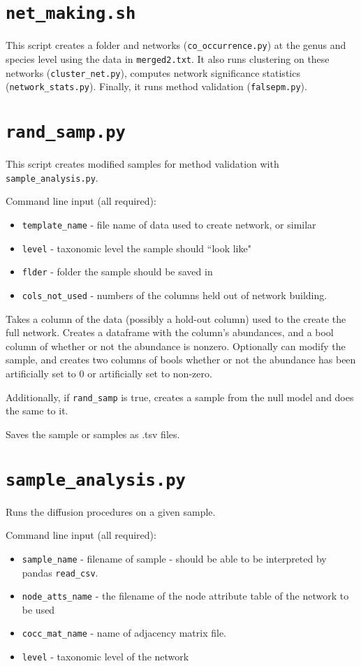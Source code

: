 \documentclass[10pt]{article}
\theoremstyle{definition}
\numberwithin{theorem}{section}
\numberwithin{definition}{section}
\numberwithin{lemma}{section}
\numberwithin{corollary}{section}
\numberwithin{clm}{section}
\numberwithin{rmk}{section}
\begin{document}
\cprotect \section{\verb|net_making.sh|}

This script creates a folder and networks (\verb|co_occurrence.py|) at the genus and species level using the data in \verb|merged2.txt|. It also runs clustering on these networks (\verb|cluster_net.py|), computes network significance statistics (\verb|network_stats.py|). Finally, it runs method validation (\verb|falsepm.py|).

\cprotect \section{\verb|rand_samp.py|}

This script creates modified samples for method validation with \verb|sample_analysis.py|.

Command line input (all required):
\begin{itemize}
	\item \verb|template_name| - file name of data used to create network, or similar
	\item \verb|level| - taxonomic level the sample should ``look like"
	\item \verb|flder| - folder the sample should be saved in
	\item \verb|cols_not_used| - numbers of the columns held out of network building.
\end{itemize}

Takes a column of the data (possibly a hold-out column) used to the create the full network. Creates a dataframe with the column's abundances, and a bool column of whether or not the abundance is nonzero. Optionally can modify the sample, and creates two columns of bools whether or not the abundance has been artificially set to 0 or artificially set to non-zero.

Additionally, if \verb|rand_samp| is true, creates a sample from the null model and does the same to it. 

Saves the sample or samples as .tsv files.


\cprotect \section{\verb|sample_analysis.py|}

Runs the diffusion procedures on a given sample.

Command line input (all required):
\begin{itemize}
	\item \verb|sample_name| - filename of sample - should be able to be interpreted by pandas \verb|read_csv|.
	\item \verb|node_atts_name| - the filename of the node attribute table of the network to be used
	\item \verb|cocc_mat_name| - name of adjacency matrix file.
	\item \verb|level| - taxonomic level of the network
\end{itemize}
\end{document}
